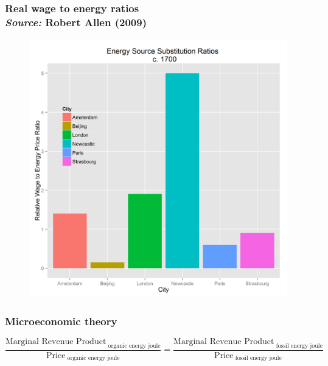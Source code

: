 \documentclass[final]{beamer}
\begin{document}
\begin{frame}
\frametitle{Real wage to energy ratios\\\textit{Source:} Robert Allen (2009)}
\begin{figure}[p!]
\center
\label{fig:wage-energy}
\includegraphics[height=0.8\textheight]{wage-energy.png}
\end{figure}
\end{frame}

\begin{frame}
\frametitle{Microeconomic theory}
\scriptsize{
		\begin{equation}
		\label{eq:mrp}
		\frac{\text{Marginal Revenue Product}_{\text{ organic energy joule}}}{\text{Price}_{\text{ organic energy joule}}} = \frac{\text{Marginal Revenue Product}_{\text{ fossil energy joule}}}{\text{Price}_{\text{ fossil energy joule}}}
		\end{equation}
}
\end{frame}

\end{document}
